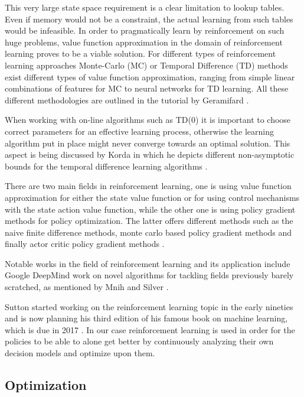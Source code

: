 \documentclass{seal_thesis}
\begin{document}
This very large state space requirement is a clear limitation to lookup tables. Even if memory would not be a constraint, the actual learning from such tables would be infeasible. In order to pragmatically learn by reinforcement on such huge problems, value function approximation in the domain of reinforcement learning proves to be a viable solution. For different types of reinforcement learning approaches \ie Monte-Carlo (MC) or Temporal Difference (TD) methods exist different types of value function approximation, ranging from simple linear combinations of features for MC to neural networks for TD learning. All these different methodologies are outlined in the tutorial by Geramifard \cite{Geramifard2013}.

When working with on-line algorithms such as TD(0) it is important to choose correct parameters for an effective learning process, otherwise the learning algorithm put in place might never converge towards an optimal solution. This aspect is being discussed by Korda in which he depicts different non-asymptotic bounds for the temporal difference learning algorithms \cite{Korda2014}.

There are two main fields in reinforcement learning, one is using value function approximation for either the state value function or for using control mechanisms with the state action value function, while the other one is using policy gradient methods for policy optimization. The latter offers different methods such as the naive finite difference methods, monte carlo based policy gradient methods and finally actor critic policy gradient methods \cite{Silver2014}.

Notable works in the field of reinforcement learning and its application include Google DeepMind work on novel algorithms for tackling fields previously barely scratched, as mentioned by Mnih \etal and Silver \etal \cite{Mnih2015,Silver2016}.

Sutton started working on the reinforcement learning topic in the early nineties and is now planning his third edition of his famous book on machine learning, which is due in 2017 \cite{Sutton2017}. In our case reinforcement learning is used in order for the policies to be able to alone get better by continuously analyzing their own decision models and optimize upon them.

\subsection{Optimization}
\end{document}
